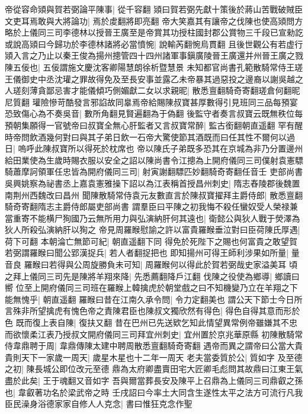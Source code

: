 帝從容命熲與賀若弼論平陳事|{
	從千容翻}
熲曰賀若弼先獻十策後於蔣山苦戰破賊臣文吏耳焉敢與大將論功|{
	焉於䖍翻將即亮翻}
帝大笑嘉其有讓帝之伐陳也使高熲問方略於上儀同三司李德林以授晉王廣至是帝賞其功授柱國封郡公賞物三千段已宣勑訖或說高熲曰今歸功於李德林諸將必當憤惋|{
	說輸芮翻惋烏貫翻}
且後世觀公有若虚行熲入言之乃止以秦王俊為揚州摠管四十四州諸軍事鎭廣陵晉王廣還并州晉王廣之戮陳五佞也|{
	五佞謂施文慶沈客卿陽慧朗徐析暨慧景}
未知都官尚書孔範散騎常侍王瑳王儀御史中丞沈瓘之罪故得免及至長安事並露乙未帝暴其過惡投之邊裔以謝吳越之人瑳刻薄貪鄙忌害才能儀傾巧側媚獻二女以求親昵|{
	散悉亶翻騎奇寄翻瑳倉何翻昵尼質翻}
瓘險慘苛酷發言邪諂故同辠焉帝給賜陳叔寶甚厚數得引見班同三品每預宴恐致傷心為不奏吳音|{
	數所角翻見賢遍翻為于偽翻}
後監守者奏言叔寶云既無秩位每預朝集願得一官號帝曰叔寶全無心肝監者又言叔寶常醉|{
	監古銜翻朝直遥翻}
罕有醒時帝問飲酒幾何對曰與其子弟日飲一石帝大驚使節其酒既而曰任其性不爾何以過日|{
	嗚呼此陳叔寶所以得死於枕席也}
帝以陳氏子弟既多恐其在京城為非乃分置邊州給田業使為生歲時賜衣服以安全之詔以陳尚書令江摠為上開府儀同三司僕射袁憲驃騎蕭摩訶領軍任忠皆為開府儀同三司|{
	射寅謝翻驃匹妙翻騎奇寄翻任音壬}
吏部尚書吳興姚察為祕書丞上嘉袁憲雅操下詔以為江表稱首授昌州刺史|{
	隋志舂陵郡後魏置南荆州西魏改曰昌州}
聞陳散騎常侍袁元友數直言於陳叔寶擢拜主爵侍郎|{
	散悉亶翻騎奇寄翻隋志主爵侍郎屬吏部尚書}
謂羣臣曰平陳之初我悔不殺任蠻奴受人榮禄兼當重寄不能横尸狥國乃云無所用力與弘演納肝何其遠也|{
	衛懿公與狄人戰于熒澤為狄人所殺弘演納肝以狥之}
帝見周羅睺慰諭之許以富貴羅睺垂泣對曰臣荷陳氏厚遇|{
	荷下可翻}
本朝淪亡無節可紀|{
	朝直遥翻下同}
得免於死陛下之賜也何富貴之敢望賀若弼謂羅睺曰聞公郢漢捉兵|{
	若人者翻捉把也}
即知揚州可得王師利涉果如所量|{
	量音良}
羅睺曰若得與公周旋勝負未可知|{
	周羅睺何以得此於賀若弼哉史家溢美耳}
頃之拜上儀同三司先是陳將羊翔來降|{
	先悉薦翻降戶江翻}
伐陳之役使為鄉導|{
	鄉讀曰嚮}
位至上開府儀同三司班在羅睺上韓擒虎於朝堂戲之曰不知機變乃立在羊翔之下能無愧乎|{
	朝直遥翻}
羅睺曰昔在江南久承令問|{
	令力定翻美也}
謂公天下節士今日所言殊非所望擒虎有愧色帝之責陳君臣也陳叔文獨欣然有得色|{
	得色自得其意而形於色}
既而復上表自陳|{
	復扶又翻}
昔在巴州已先送欵乞知此情望異常例帝雖嫌其不忠而欲懷柔江表乃授叔文開府儀同三司拜宜州刺史|{
	宜州置於京兆華原縣}
初陳散騎常侍韋鼎聘于周|{
	韋鼎傳陳太建中聘周散悉亶翻騎奇寄翻}
遇帝而異之謂帝曰公當大貴貴則天下一家歲一周天|{
	歲星木星也十二年一周天}
老夫當委質於公|{
	質如字}
及至德之初|{
	陳長城公即位改元至德}
鼎為太府卿盡賣田宅大匠卿毛彪問其故鼎曰江東王氣盡於此矣|{
	王于魂翻又音如字}
吾與爾當葬長安及陳平上召鼎為上儀同三司鼎叡之孫也|{
	韋叡著功名於梁武帝之時}
壬戌詔曰今率土大同含生遂性太平之法方可流行凡我臣民澡身浴德家家自修人人克念|{
	書曰惟狂克念作聖}

